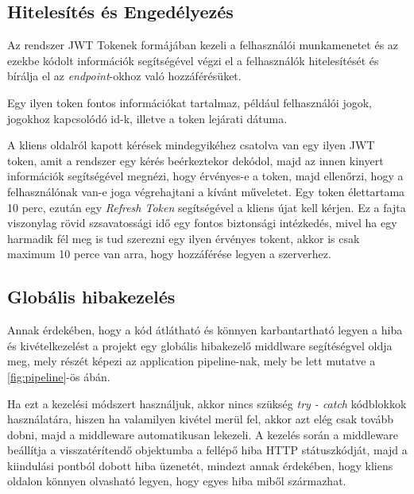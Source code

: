 \subsection{Hitelesítés és Engedélyezés}

Az rendszer JWT Tokenek\cite{jwtdocs} formájában kezeli a felhasználói munkamenetet és az ezekbe kódolt információk segítségével végzi el a felhasználók hitelesítését és bírálja el az \textit{endpoint}-okhoz való hozzáférésüket.

Egy ilyen token fontos információkat tartalmaz, például felhasználói jogok, jogokhoz kapcsolódó id-k, illetve a token lejárati dátuma. 

A kliens oldalról kapott kérések mindegyikéhez csatolva van egy ilyen JWT token, amit a rendszer egy kérés beérkeztekor dekódol, majd az innen kinyert információk segítségével megnézi, hogy érvényes-e a token, majd ellenőrzi, hogy a felhasználónak van-e joga végrehajtani a kívánt műveletet. Egy token élettartama 10 perc, ezután egy \textit{Refresh Token} segítségével a kliens újat kell kérjen. Ez a fajta viszonylag rövid szsavatossági idő egy fontos biztonsági intézkedés, mivel ha egy harmadik fél meg is tud szerezni egy ilyen érvényes tokent, akkor is csak maximum 10 perce van arra, hogy hozzáférése legyen a szerverhez. 

\subsection{Globális hibakezelés}

Annak érdekében, hogy a kód átlátható és könnyen karbantartható legyen a hiba és kivételkezelést a projekt egy globális hibakezelő middlware segítéségvel oldja meg, mely részét képezi az application pipeline-nak, mely be lett mutatve a \ref{fig:pipeline}-ös ábán.

Ha ezt a kezelési módszert használjuk, akkor nincs szükség \textit{try - catch} kódblokkok használatára, hiszen ha valamilyen kivétel merül fel, akkor azt elég csak tovább dobni, majd a middleware automatikusan lekezeli. A kezelés során a middleware beállítja a visszatérítendő objektumba a fellépő hiba HTTP státuszkódját, majd a kiindulási pontból dobott hiba üzenetét, mindezt annak érdekében, hogy kliens oldalon könnyen olvasható legyen, hogy egyes hiba miből származhat.

\newpage

